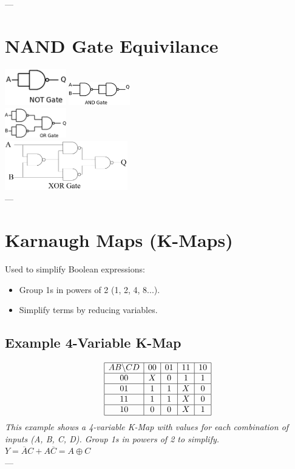 \documentclass[10pt]{article}
\begin{document}
--- %
\begin{multicols*}{2}

\section{NAND Gate Equivilance}
\includegraphics[width=0.2\textwidth]{NotGateFromNAND.png}
\includegraphics[width=0.2\textwidth]{AndGateFromNAND.png}\\
\includegraphics[width=0.2\textwidth]{OrGateFromNAND.png}\\
\includegraphics[width=0.4\textwidth]{XorGateFromNAND.png}\\
--- %

\section{Karnaugh Maps (K-Maps)}

Used to simplify Boolean expressions:
\begin{itemize}\itemsep0pt
    \item Group 1s in powers of 2 (1, 2, 4, 8...).
    \item Simplify terms by reducing variables.
\end{itemize}

\subsection{Example 4-Variable K-Map}
\[
\begin{array}{|c|c|c|c|c|}
\hline
AB \backslash CD & 00 & 01 & 11 & 10 \\
\hline
00 & X & 0 & 1 & 1 \\
\hline
01 & 1 & 1 & X & 0 \\
\hline
11 & 1 & 1 & X & 0 \\
\hline
10 & 0 & 0 & X & 1 \\
\hline
\end{array}
\]
\textit{This example shows a 4-variable K-Map with values for each combination of inputs (A, B, C, D). Group 1s in powers of 2 to simplify.}\\
$Y = \overline{A}C + A\overline{C} = A \oplus C$\\
--- %


\end{multicols*}
\end{document}
